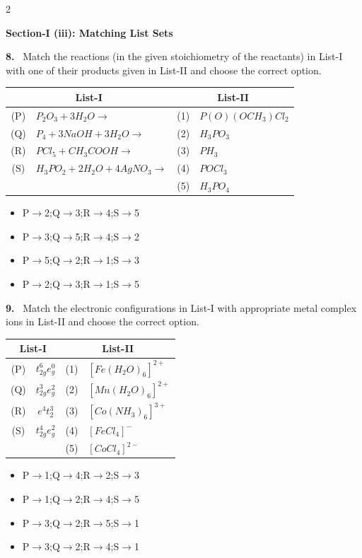 \documentclass[10pt]{extarticle}
\newcommand{\sect}[1]{\par\smallskip\noindent\textbf{#1}\par}
\newcommand{\qn}[1]{\par\smallskip\noindent\textbf{#1.}~}
\newenvironment{qoptions}{\begin{itemize}[leftmargin=1.8em,itemsep=1pt,topsep=2pt,label={}]}{\end{itemize}}
\newcommand{\opt}[2]{\item[(#1)] #2}
\begin{document}
\begin{multicols}{2}
\sect{Section-I (iii): Matching List Sets}

\qn{8} Match the reactions (in the given stoichiometry of the reactants) in List-I with one of their products given in List-II and choose the correct option.
\begin{center}
\begin{tabular}{|c|p{3.15cm}|c|p{2.7cm}|}
\hline
\multicolumn{2}{|c|}{List-I} & \multicolumn{2}{c|}{List-II} \\
\hline
(P) & $P_2O_3+3H_2O\to$ & (1) & $P(O)(OCH_3)Cl_2$ \\
\hline
(Q) & $P_4+3NaOH+3H_2O\to$ & (2) & $H_3PO_3$ \\
\hline
(R) & $PCl_5+CH_3COOH\to$ & (3) & $PH_3$ \\
\hline
(S) & $H_3PO_2+2H_2O+4AgNO_3\to$ & (4) & $POCl_3$ \\
\hline
 & & (5) & $H_3PO_4$ \\
\hline
\end{tabular}
\end{center}
\begin{qoptions}
\opt{A}{P$\to$2;Q$\to$3;R$\to$4;S$\to$5}
\opt{B}{P$\to$3;Q$\to$5;R$\to$4;S$\to$2}
\opt{C}{P$\to$5;Q$\to$2;R$\to$1;S$\to$3}
\opt{D}{P$\to$2;Q$\to$3;R$\to$1;S$\to$5}
\end{qoptions}

\qn{9} Match the electronic configurations in List-I with appropriate metal complex ions in List-II and choose the correct option.\\
\relax[Atomic Number: Fe = 26, Mn = 25, Co = 27]
\begin{center}
\begin{tabular}{|c|c|c|l|}
\hline
\multicolumn{2}{|c|}{List-I} & \multicolumn{2}{c|}{List-II} \\
\hline
(P) & $t_{2g}^6e_g^0$ & (1) & $[Fe(H_2O)_6]^{2+}$ \\
\hline
(Q) & $t_{2g}^3e_g^2$ & (2) & $[Mn(H_2O)_6]^{2+}$ \\
\hline
(R) & $e^4t_2^3$ & (3) & $[Co(NH_3)_6]^{3+}$ \\
\hline
(S) & $t_{2g}^4e_g^2$ & (4) & $[FeCl_4]^-$ \\
\hline
 & & (5) & $[CoCl_4]^{2-}$ \\
\hline
\end{tabular}
\end{center}
\begin{qoptions}
\opt{A}{P$\to$1;Q$\to$4;R$\to$2;S$\to$3}
\opt{B}{P$\to$1;Q$\to$2;R$\to$4;S$\to$5}
\opt{C}{P$\to$3;Q$\to$2;R$\to$5;S$\to$1}
\opt{D}{P$\to$3;Q$\to$2;R$\to$4;S$\to$1}
\end{qoptions}


\end{multicols}
\end{document}
